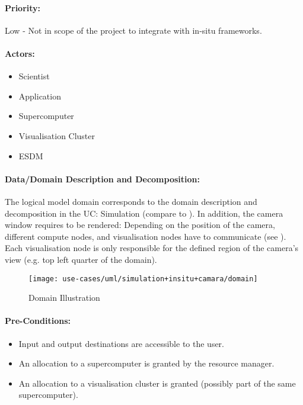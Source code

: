 \paragraph{Priority:}
Low - Not in scope of the project to integrate with in-situ frameworks.

\paragraph{Actors:}
\begin{itemize}
	\item Scientist
	\item Application
	\item Supercomputer
	\item Visualisation	Cluster
	\item ESDM
\end{itemize}


\paragraph{Data/Domain Description and Decomposition:}
The logical model domain corresponds to the domain description and decomposition in the UC: Simulation (compare to ).
In addition, the camera window requires to be rendered:
Depending on the position of the camera, different compute nodes, and visualisation nodes have to communicate (see ).
Each visualisation node is only responsible for the defined region of the camera's view (e.g. top left quarter of the domain).


\begin{figure}
	\centering
	\texttt{[image: use-cases/uml/simulation+insitu+camara/domain]}
	\caption{Domain Illustration}
	\label{fig:domain simulation + in-situ + cam}
\end{figure}



\paragraph{Pre-Conditions:}
\begin{itemize}
	\item Input and output destinations are accessible to the user.
	\item An allocation to a supercomputer is granted by the resource manager.
	\item An allocation to a visualisation cluster is granted (possibly part of the same supercomputer).
\end{itemize}



